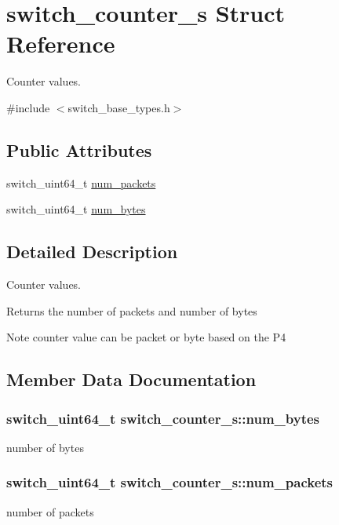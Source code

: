 \hypertarget{structswitch__counter__s}{\section{switch\+\_\+counter\+\_\+s Struct Reference}
\label{structswitch__counter__s}
}


Counter values.  




{\ttfamily \#include $<$switch\+\_\+base\+\_\+types.\+h$>$}

\subsection*{Public Attributes}
\begin{DoxyCompactItemize}
\item 
switch\+\_\+uint64\+\_\+t \hyperlink{structswitch__counter__s_ab1e6699c304b7ce2488b6b90627cb373}{num\+\_\+packets}
\item 
switch\+\_\+uint64\+\_\+t \hyperlink{structswitch__counter__s_afeaaf853fa07e37a55c850725e8be619}{num\+\_\+bytes}
\end{DoxyCompactItemize}


\subsection{Detailed Description}
Counter values. 

Returns the number of packets and number of bytes

\begin{DoxyNote}{Note}
counter value can be packet or byte based on the P4 
\end{DoxyNote}


\subsection{Member Data Documentation}
\hypertarget{structswitch__counter__s_afeaaf853fa07e37a55c850725e8be619}{
\subsubsection[{num\+\_\+bytes}]{\setlength{\rightskip}{0pt plus 5cm}switch\+\_\+uint64\+\_\+t switch\+\_\+counter\+\_\+s\+::num\+\_\+bytes}}\label{structswitch__counter__s_afeaaf853fa07e37a55c850725e8be619}
number of bytes \hypertarget{structswitch__counter__s_ab1e6699c304b7ce2488b6b90627cb373}{
\subsubsection[{num\+\_\+packets}]{\setlength{\rightskip}{0pt plus 5cm}switch\+\_\+uint64\+\_\+t switch\+\_\+counter\+\_\+s\+::num\+\_\+packets}}\label{structswitch__counter__s_ab1e6699c304b7ce2488b6b90627cb373}
number of packets 

